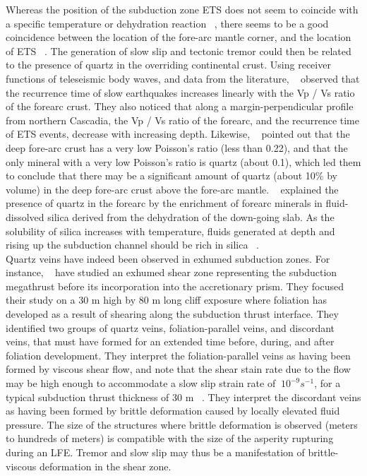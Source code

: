 \documentclass[draft]{agujournal2019}
\begin{document}
Whereas the position of the subduction zone ETS does not seem to coincide with a specific temperature or dehydration reaction ~\cite{PEA_2009}, there seems to be a good coincidence between the location of the fore-arc mantle corner, and the location of ETS ~\cite{HYN_2015}. The generation of slow slip and tectonic tremor could then be related to the presence of quartz in the overriding continental crust. Using receiver functions of teleseismic body waves, and data from the literature, ~ observed that the recurrence time of slow earthquakes increases linearly with the Vp / Vs ratio of the forearc crust. They also noticed that along a margin-perpendicular profile from northern Cascadia, the Vp / Vs ratio of the forearc, and the recurrence time of ETS events, decrease with increasing depth. Likewise, ~  pointed out that the deep fore-arc crust has a very low Poisson's ratio (less than 0.22), and that the only mineral with a very low Poisson's ratio is quartz (about 0.1), which led them to conclude that there may be a significant amount of quartz (about 10\% by volume) in the deep fore-arc crust above the fore-arc mantle. ~ explained the presence of quartz in the forearc by the enrichment of forearc minerals in fluid-dissolved silica derived from the dehydration of the down-going slab. As the solubility of silica increases with temperature, fluids generated at depth and rising up the subduction channel should be rich in silica ~\cite{HYN_2015}. \\

Quartz veins have indeed been observed in exhumed subduction zones. For instance, ~ have studied an exhumed shear zone representing the subduction megathrust before its incorporation into the accretionary prism. They focused their study on a 30 m high by 80 m long cliff exposure where foliation has developed as a result of shearing along the subduction thrust interface. They identified two groups of quartz veins, foliation-parallel veins, and discordant veins, that must have formed for an extended time before, during, and after foliation development. They interpret the foliation-parallel veins as having been formed by viscous shear flow, and note that the shear stain rate due to the flow may be high enough to accommodate a slow slip strain rate of $~10^{-9} s^{-1}$, for a typical subduction thrust thickness of 30 m ~\cite{ROW_2013}. They interpret the discordant veins as having been formed by brittle deformation caused by locally elevated fluid pressure. The size of the structures where brittle deformation is observed (meters to hundreds of meters) is compatible with the size of the asperity rupturing during an LFE. Tremor and slow slip may thus be a manifestation of brittle-viscous deformation in the shear zone. \\
\end{document}
